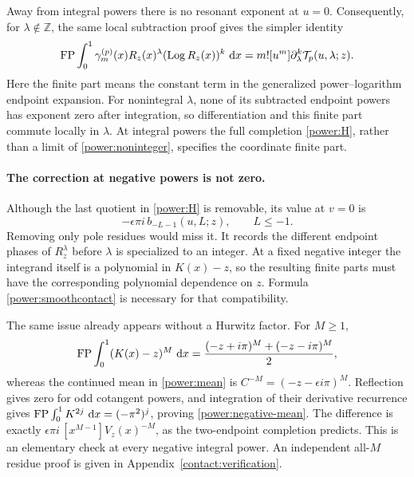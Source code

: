 Away from integral powers there is no resonant exponent at $u=0$.
Consequently, for $\lambda\notin\mathbb Z$, the same local subtraction
proof gives the simpler identity
\begin{equation}\label{power:noninteger}
 \operatorname{FP}\int_0^1\gamma_m^{(p)}(x)R_z(x)^\lambda
             (\operatorname{Log} R_z(x))^k\,\mathop{}\!\mathrm{d} x
 =m![u^m]\partial_\lambda^k\mathcal T_p(u,\lambda;z).
\end{equation}
Here the finite part means the constant term in the generalized
power--logarithm endpoint expansion.  For nonintegral $\lambda$,
none of its subtracted endpoint powers has exponent zero after
integration, so differentiation and this finite part commute locally
in $\lambda$.  At integral powers the full completion
\eqref{power:H}, rather than a limit of \eqref{power:noninteger},
specifies the coordinate finite part.

\paragraph{The correction at negative powers is not zero.}
Although the last quotient in \eqref{power:H} is removable, its
value at $v=0$ is
\begin{equation}\label{power:smoothcontact}
 -\epsilon\pi i\,b_{-L-1}(u,L;z),\qquad L\le-1.
\end{equation}
Removing only pole residues would miss it.  It records the different
endpoint phases of $R_z^\lambda$ before $\lambda$ is specialized to
an integer.  At a fixed negative integer the integrand itself is a
polynomial in $K(x)-z$, so the resulting finite parts must have the
corresponding polynomial dependence on $z$.  Formula
\eqref{power:smoothcontact} is necessary for that compatibility.

The same issue already appears without a Hurwitz factor.  For $M\ge1$,
\begin{equation}\label{power:negative-mean}
 \operatorname{FP}\int_0^1(K(x)-z)^M\,\mathop{}\!\mathrm{d} x
 =\frac{(-z+i\pi)^M+(-z-i\pi)^M}{2},
\end{equation}
whereas the continued mean in \eqref{power:mean} is
$C^{-M}=(-z-\epsilon i\pi)^M$.  Reflection gives zero for odd
cotangent powers, and integration of their derivative recurrence gives
$\operatorname{FP}\int_0^1K^{2j}\,\mathop{}\!\mathrm{d} x=(-\pi^2)^j$, proving
\eqref{power:negative-mean}.  The difference is exactly
$\epsilon\pi i\,[x^{M-1}]V_z(x)^{-M}$, as the two-endpoint
completion predicts.  This is an elementary check at every negative
integral power.
An independent all-$M$ residue proof is given in
Appendix~\ref{contact:verification}.

